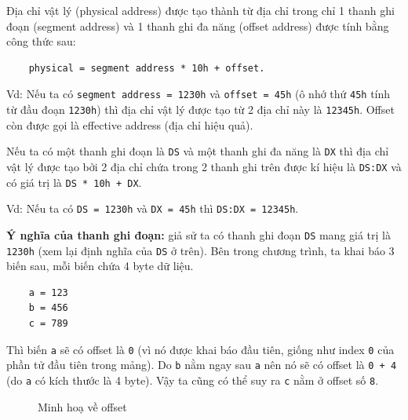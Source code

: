 \documentclass[12pt]{report}
\newcommand{\code}[1]{\texttt{#1}}
\begin{document}
Địa chỉ vật lý (physical address) được tạo thành từ địa chỉ trong chỉ 1 thanh ghi đoạn (segment address) và 1 thanh ghi đa năng (offset address) được tính bằng công thức sau:

\begin{center}
\begin{verbatim}
    physical = segment address * 10h + offset.
\end{verbatim}
\end{center}

Vd: Nếu ta có \code{segment address = 1230h} và \code{offset = 45h} (ô nhớ thứ \code{45h} tính từ đầu đoạn \code{1230h}) thì địa chỉ vật lý được tạo từ 2 địa chỉ này là \code{12345h}. Offset còn được gọi là effective address (địa chỉ hiệu quả).\bigskip

Nếu ta có một thanh ghi đoạn là \code{DS} và một thanh ghi đa năng là \code{DX} thì địa chỉ vật lý được tạo bởi 2 địa chỉ chứa trong 2 thanh ghi trên được kí hiệu là \code{DS:DX} và có giá trị là \code{DS * 10h + DX}. 

Vd: Nếu ta có \code{DS = 1230h} và \code{DX = 45h} thì \code{DS:DX = 12345h}.\bigskip

\textbf{Ý nghĩa của thanh ghi đoạn:} giả sử ta có thanh ghi đoạn \code{DS} mang giá trị là \code{1230h} (xem lại định nghĩa của \code{DS} ở trên). Bên trong chương trình, ta khai báo 3 biến sau, mỗi biến chứa 4 byte dữ liệu.
\begin{verbatim}
    a = 123
    b = 456
    c = 789
\end{verbatim}
Thì biến \code a sẽ có offset là \code 0 (vì nó được khai báo đầu tiên, giống như index \code 0 của phần tử đầu tiên trong mảng). Do \code b nằm ngay sau \code a nên nó sẽ có offset là \code{0 + 4} (do \code a có kích thước là 4 byte). Vậy ta cũng có thể suy ra \code c nằm ở offset số \code 8.

\begin{figure}[H]
    \centering
    \caption{Minh hoạ về offset}
\end{figure}
\end{document}
